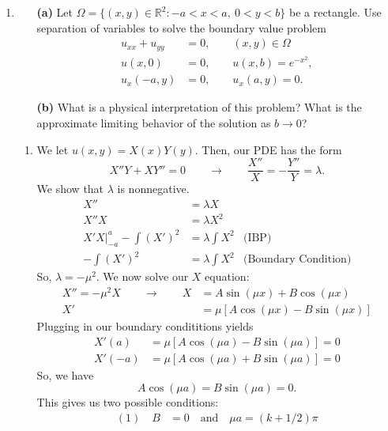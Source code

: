 \documentclass[10pt,letterpaper]{report}
\newcommand{\R}{\mathbb{R}}
\newcommand{\so}{\qquad \rightarrow \qquad}
\begin{document}
\begin{enumerate}
\item 
\begin{qbox}
\begin{itemize}\vspace{-1.5em}
\item[\textbf{(a)}] Let $\Omega = \{(x, y) \in \R^2 : -a < x < a,\ 0 < y < b\}$ be a rectangle. Use separation of variables to solve the boundary value problem
\begin{align*}
    u_{xx} +u_{yy} &= 0, \qquad  (x, y) \in \Omega \\
    u(x, 0) &= 0, \qquad  u(x,b) = e^{-x^2}, \\
    u_x(-a, y) &= 0, \qquad  u_x(a, y) = 0.
\end{align*}
\item[\textbf{(b)}] What is a physical interpretation of this problem? What is the approximate limiting behavior of the solution as $b \to 0$? 
\end{itemize}
\end{qbox}
\begin{enumerate}
\item 
We let $u(x, y) = X(x)Y(y)$. Then, our PDE has the form
\[
X''Y + XY'' = 0 \so \frac{X''}{X} = -\frac{Y''}{Y} = \lambda.
\]
We show that $\lambda$ is nonnegative.
\begin{align*}
    X'' &= \lambda X \\
    X''X &= \lambda X^2 \\
    X'X\big\vert_{-a}^a - \int(X')^2 &= \lambda \int X^2 &\textrm{(IBP)}
    \\
    - \int(X')^2 &= \lambda \int X^2 &\textrm{(Boundary Condition)} 
\end{align*}
So, $\lambda = -\mu^2$. We now solve our $X$ equation:
\begin{align*}
    X'' = -\mu^2 X \so X &= A\sin(\mu x) + B\cos(\mu x) \\
    X' &= \mu\left[A\cos(\mu x) - B\sin(\mu x)\right]
\end{align*}
Plugging in our boundary condititions yields
\begin{align*}
    X'(a) &= \mu\left[A\cos(\mu a) - B\sin(\mu a)\right] = 0 \\
    X'(-a) &= \mu\left[A\cos(\mu a) + B\sin(\mu a)\right] = 0
\end{align*}
So, we have
\[
A\cos(\mu a) = B\sin(\mu a) = 0.
\]
This gives us two possible conditions:
\begin{align*}
    (1)\quad  B &= 0 \quad\textrm{and}\quad \mu a = (k + 1/2)\pi \\

\end{align*}
\end{enumerate}
\end{enumerate}
\end{document}
